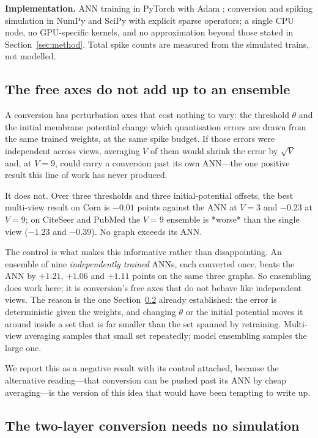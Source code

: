 \documentclass[10pt,twocolumn]{article}
\newcommand{\secref}[1]{Section~\ref{#1}}
\begin{document}
\textbf{Implementation.} ANN training in PyTorch \citep{paszke2019pytorch} with Adam
\citep{kingma2015adam}; conversion and spiking simulation in NumPy \citep{harris2020array} and SciPy
\citep{virtanen2020scipy} with explicit sparse operators; a single CPU node, no GPU-specific
kernels, and no approximation beyond those stated in \secref{sec:method}. Total spike counts are
measured from the simulated trains, not modelled.

\subsection{The free axes do not add up to an ensemble}
\label{sec:ensemble}

A conversion has perturbation axes that cost nothing to vary: the threshold $\theta$ and the initial
membrane potential change which quantisation errors are drawn from the same trained weights, at the
same spike budget. If those errors were independent across views, averaging $V$ of them would shrink
the error by $\sqrt{V}$ and, at $V=9$, could carry a conversion past its own ANN---the one positive
result this line of work has never produced.

It does not. Over three thresholds and three initial-potential offsets, the best multi-view result on
Cora is $-0.01$ points against the ANN at $V=3$ and $-0.23$ at $V=9$; on CiteSeer and PubMed the
$V=9$ ensemble is *worse* than the single view ($-1.23$ and $-0.39$). No graph exceeds its ANN.

The control is what makes this informative rather than disappointing. An ensemble of nine
\emph{independently trained} ANNs, each converted once, beats the ANN by $+1.21$, $+1.06$ and $+1.11$
points on the same three graphs. So ensembling does work here; it is conversion's free axes that do
not behave like independent views. The reason is the one \secref{sec:closed} already established: the
error is deterministic given the weights, and changing $\theta$ or the initial potential moves it
around inside a set that is far smaller than the set spanned by retraining. Multi-view averaging
samples that small set repeatedly; model ensembling samples the large one.

We report this as a negative result with its control attached, because the alternative reading---that
conversion can be pushed past its ANN by cheap averaging---is the version of this idea that would
have been tempting to write up.

\subsection{The two-layer conversion needs no simulation}
\label{sec:closed}
\end{document}
